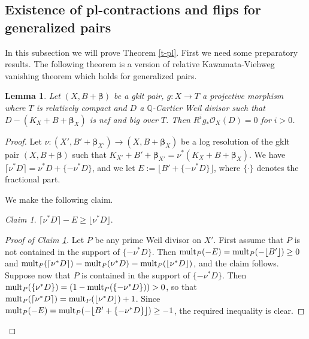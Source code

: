 \documentclass[12pt]{amsart}
\theoremstyle{plain}
\newtheorem{lemma}[theorem]{Lemma}
\theoremstyle{remark}
\theoremstyle{definition}
\newcommand{\<}{\leq}
\newcommand{\OO}{{\mathcal{O}}}
\newcommand{\Q}{{\mathbb{Q}}}
\newcommand{\mult}{{\rm mult}}
\def\bbeta{\boldsymbol{\beta}}
\theoremstyle{definition}
\theoremstyle{definition}
\numberwithin{equation}{section}
\theoremstyle{remark}
\newtheorem{claim}[theorem]{Claim}
\begin{document}
\subsection{ Existence of pl-contractions and flips for generalized pairs} In this subsection we will prove Theorem \ref{t-pl}. First we need some preparatory results. The following theorem is a version of relative Kawamata-Viehweg vanishing theorem which holds for generalized pairs. 
\begin{lemma}\label{l-wdvan} Let $(X,B+\bbeta)$ be a  gklt pair, $g:X\to T$ a projective morphism where $T$ is relatively compact and $D$ a $\Q$-Cartier Weil divisor such that $D-(K_X+B+\bbeta_X)$ is nef and big over $T$. Then $R^ig_* \OO _X(D)=0$ for $i>0$.
\end{lemma}
\begin{proof}
Let $\nu :(X',B'+\bbeta_{X'})\to (X,B+\bbeta_X) $ be a log resolution of the gklt pair $(X,B+\bbeta)$ such that $K_{X'}+B'+\bbeta_{X'}=\nu^*(K_X+B+\bbeta_X)$. 
We have $\lceil \nu ^*D\rceil=\nu ^*D+\{-\nu^*D\}$, and we let  $E:=\lfloor B'+\{-\nu ^*D\}\rfloor $, where $\{\cdot\}$ denotes the fractional part. 

We make the following claim.
\begin{claim}\label{clm:divisor-comparison}
  $\lceil \nu ^*D\rceil -E\geq \lfloor \nu ^*D\rfloor $.  
\end{claim}
  
\begin{proof}[Proof of Claim \ref{clm:divisor-comparison}]
Let $P$ be any prime Weil divisor on $X'$. First assume that $P$ is not contained in the support of $\{-\nu ^*D\}$. Then ${\mult}_P(-E)={\mult}_P(-\lfloor B'\rfloor )\geq 0$ and ${\mult}_P(\lceil \nu ^*D\rceil) =\mult_P(\nu^*D)={\mult}_P(\lfloor \nu ^*D\rfloor )$, and the claim follows.  Suppose now that $P$ is contained in the support of $\{-\nu ^*D\}$. Then $\mult_P(\{\nu^*D\})=(1-\mult_P(\{-\nu^*D\}))>0$, so that ${\rm mult}_P(\lceil \nu ^*D\rceil) = {\rm mult}_P(\lfloor \nu ^*D\rfloor )+1$. Since  ${\rm mult}_P(-E)={\rm mult}_P(-\lfloor B'+\{-\nu ^*D\}\rfloor )\geq -1$, the required inequality is clear.  
\end{proof}  



\end{proof}
\end{document}
